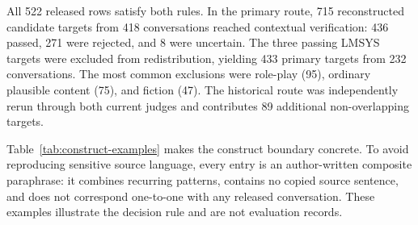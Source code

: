 \documentclass{article}
\begin{document}
All 522 released rows satisfy both rules. In the primary route, 715 reconstructed candidate targets from 418 conversations reached contextual verification: 436 passed, 271 were rejected, and 8 were uncertain. The three passing LMSYS targets were excluded from redistribution, yielding 433 primary targets from 232 conversations. The most common exclusions were role-play (95), ordinary plausible content (75), and fiction (47). The historical route was independently rerun through both current judges and contributes 89 additional non-overlapping targets.

Table~\ref{tab:construct-examples} makes the construct boundary concrete. To avoid reproducing sensitive source language, every entry is an author-written composite paraphrase: it combines recurring patterns, contains no copied source sentence, and does not correspond one-to-one with any released conversation. These examples illustrate the decision rule and are not evaluation records.
\end{document}
